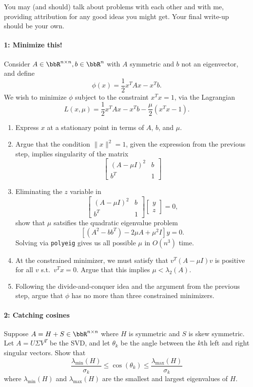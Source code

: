 \documentclass[12pt, leqno]{article} %
\begin{document}

You may (and should) talk about problems with each other and with me,
providing attribution for any good ideas you might get.  Your final
write-up should be your own.

\paragraph*{1: Minimize this!}
Consider $A \in \bbR^{n \times n}, b \in \bbR^n$ with $A$ symmetric
and $b$ not an eigenvector, and define
\[
  \phi(x) = \frac{1}{2} x^T A x - x^T b.
\]
We wish to minimize $\phi$ subject to the constraint $x^T x = 1$,
via the Lagrangian
\[
  L(x,\mu) = \frac{1}{2} x^T A x - x^T b - \frac{\mu}{2} (x^T x - 1).
\]
\begin{enumerate}
\item Express $x$ at a stationary point in terms
  of $A$, $b$, and $\mu$.
\item Argue that the condition $\|x\|^2 = 1$, given the expression
  from the previous step, implies
  singularity of the matrix
  \[
    \begin{bmatrix} (A-\mu I)^2 & b \\ b^T & 1 \end{bmatrix}
  \]
\item
  Eliminating the $z$ variable in
  \[
    \begin{bmatrix}
      (A-\mu I)^2 & b \\
      b^T & 1
    \end{bmatrix}
    \begin{bmatrix} y \\ z \end{bmatrix} = 0,
  \]
  show that $\mu$ satsifies the quadratic eigenvalue problem
  \[
    \left[ (A^2-bb^T) - 2 \mu A + \mu^2 I \right] y = 0.
  \]
  Solving via {\tt polyeig} gives
  us all possible $\mu$ in $O(n^3)$ time.
\item
  At the constrained minimizer, we must satisfy that
  $v^T (A-\mu I) v$ is positive for all $v$ s.t.~$v^T x = 0$.
  Argue that this implies $\mu < \lambda_2(A)$.
\item
  Following the divide-and-conquer idea and the argument
  from the previous step, argue that $\phi$
  has no more than three constrained minimizers.
\end{enumerate}

\paragraph*{2: Catching cosines}
Suppose $A = H+S \in \bbR^{n \times n}$ where $H$ is symmetric
and $S$ is skew symmetric.  Let $A = U \Sigma V^T$ be the SVD,
and let $\theta_k$ be the angle between the $k$th left and right
singular vectors.  Show that
\[
  \frac{\lambda_{\min}(H)}{\sigma_k} \leq \cos(\theta_k) \leq \frac{\lambda_{\max}(H)}{\sigma_k}
\]
where $\lambda_{\min}(H)$ and $\lambda_{\max}(H)$ are the smallest and largest
eigenvalues of $H$.
\end{document}
